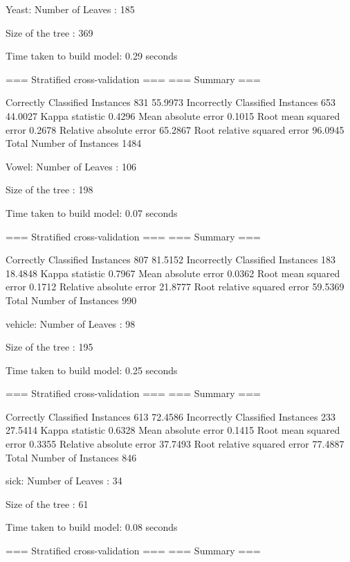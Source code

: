 Yeast:
Number of Leaves  : 	185

Size of the tree : 	369


Time taken to build model: 0.29 seconds

=== Stratified cross-validation ===
=== Summary ===

Correctly Classified Instances         831               55.9973 %
Incorrectly Classified Instances       653               44.0027 %
Kappa statistic                          0.4296
Mean absolute error                      0.1015
Root mean squared error                  0.2678
Relative absolute error                 65.2867 %
Root relative squared error             96.0945 %
Total Number of Instances             1484


Vowel:
Number of Leaves  : 	106

Size of the tree : 	198


Time taken to build model: 0.07 seconds

=== Stratified cross-validation ===
=== Summary ===

Correctly Classified Instances         807               81.5152 %
Incorrectly Classified Instances       183               18.4848 %
Kappa statistic                          0.7967
Mean absolute error                      0.0362
Root mean squared error                  0.1712
Relative absolute error                 21.8777 %
Root relative squared error             59.5369 %
Total Number of Instances              990     


vehicle:
Number of Leaves  : 	98

Size of the tree : 	195


Time taken to build model: 0.25 seconds

=== Stratified cross-validation ===
=== Summary ===

Correctly Classified Instances         613               72.4586 %
Incorrectly Classified Instances       233               27.5414 %
Kappa statistic                          0.6328
Mean absolute error                      0.1415
Root mean squared error                  0.3355
Relative absolute error                 37.7493 %
Root relative squared error             77.4887 %
Total Number of Instances              846


sick:
Number of Leaves  : 	34

Size of the tree : 	61


Time taken to build model: 0.08 seconds

=== Stratified cross-validation ===
=== Summary ===

